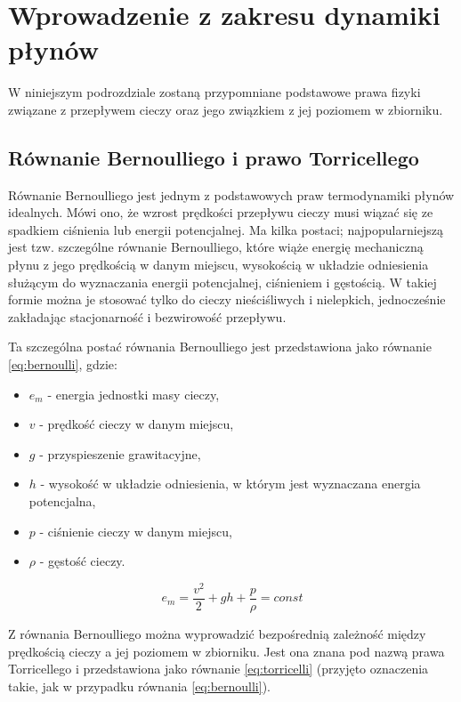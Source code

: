 \section{Wprowadzenie z zakresu dynamiki płynów}
\label{sec:plyny}

W niniejszym podrozdziale zostaną przypomniane podstawowe prawa fizyki związane z przepływem cieczy oraz jego związkiem z jej poziomem w zbiorniku.

\subsection{Równanie Bernoulliego i prawo Torricellego}
\label{sub:plyny-torr}

Równanie Bernoulliego jest jednym z podstawowych praw termodynamiki płynów idealnych. Mówi ono, że wzrost prędkości przepływu cieczy musi wiązać się ze spadkiem ciśnienia lub energii potencjalnej. Ma kilka postaci; najpopularniejszą jest tzw. szczególne równanie Bernoulliego, które wiąże energię mechaniczną płynu z jego prędkością w danym miejscu, wysokością w układzie odniesienia służącym do wyznaczania energii potencjalnej, ciśnieniem i gęstością. W takiej formie można je stosować tylko do cieczy nieściśliwych i nielepkich, jednocześnie zakładając stacjonarność i bezwirowość przepływu.

Ta szczególna postać równania Bernoulliego jest przedstawiona jako równanie \ref{eq:bernoulli}, gdzie:
\begin{itemize}
	\item $e_{m}$ - energia jednostki masy cieczy,
	\item $v$ - prędkość cieczy w danym miejscu,
	\item $g$ - przyspieszenie grawitacyjne,
	\item $h$ - wysokość w układzie odniesienia, w którym jest wyznaczana energia potencjalna,
	\item $p$ - ciśnienie cieczy w danym miejscu,
	\item $\rho$ - gęstość cieczy.
\end{itemize}

\begin{equation}\label{eq:bernoulli}
	e_{m} = \frac{v^2}{2} + gh + \frac{p}{\rho} = const
\end{equation}

Z równania Bernoulliego można wyprowadzić bezpośrednią zależność między prędkością cieczy a jej poziomem w zbiorniku. Jest ona znana pod nazwą prawa Torricellego i przedstawiona jako równanie \ref{eq:torricelli} (przyjęto oznaczenia takie, jak w przypadku równania \ref{eq:bernoulli}).

